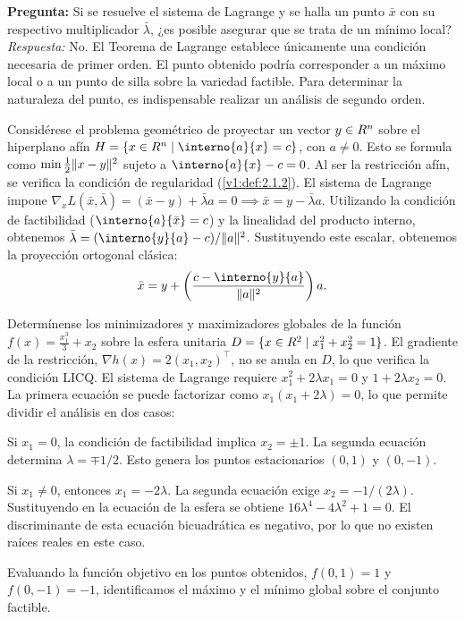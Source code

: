 \begin{controlbox}
 \textbf{Pregunta:} Si se resuelve el sistema de Lagrange y se halla un punto $\bar{x}$ con su respectivo multiplicador $\bar{\lambda}$, ¿es posible asegurar que se trata de un mínimo local? \\
 \textit{Respuesta:} No. El Teorema de Lagrange establece únicamente una condición necesaria de primer orden. El punto obtenido podría corresponder a un máximo local o a un punto de silla sobre la variedad factible. Para determinar la naturaleza del punto, es indispensable realizar un análisis de segundo orden.
\end{controlbox}

\begin{example}\label{v1:exa:2.2.3}
	Considérese el problema geométrico de proyectar un vector $y \in R^n$ sobre el hiperplano afín $H = \{ x \in \Rn \mid \interno{a}{x} = c \}$, con $a \neq 0$. Esto se formula como $\min \frac{1}{2} \lVert x - y\rVert^2$ sujeto a $\interno{a}{x} - c = 0$. Al ser la restricción afín, se verifica la condición de regularidad (\cref{v1:def:2.1.2}). El sistema de Lagrange impone $\nabla_x L(\bar{x}, \bar{\lambda}) = (\bar{x} - y) + \bar{\lambda} a = 0 \implies \bar{x} = y - \bar{\lambda} a$. Utilizando la condición de factibilidad ($\interno{a}{\bar{x}} = c$) y la linealidad del producto interno, obtenemos $\bar{\lambda} = (\interno{y}{a} - c)/\norm{a}^2$. Sustituyendo este escalar, obtenemos la proyección ortogonal clásica:
	\[
		\bar{x} = y + \left( \frac{c - \interno{y}{a}}{\norm{a}^2} \right) a.
	\]
\end{example}

\begin{example}\label{v1:exa:2.2.4}
 Determínense los minimizadores y maximizadores globales de la función $f(x) = \frac{x_1^3}{3} + x_2$ sobre la esfera unitaria $D = \{ x \in R^2 \mid x_1^2 + x_2^2 = 1 \}$. El gradiente de la restricción, $\nabla h(x) = 2(x_1, x_2)^\top$, no se anula en $D$, lo que verifica la condición LICQ. El sistema de Lagrange requiere $x_1^2 + 2\lambda x_1 = 0$ y $1 + 2\lambda x_2 = 0$. La primera ecuación se puede factorizar como $x_1(x_1 + 2\lambda) = 0$, lo que permite dividir el análisis en dos casos:
 \begin{enuthm}
 \item Si $x_1 = 0$, la condición de factibilidad implica $x_2 = \pm 1$. La segunda ecuación determina $\lambda = \mp 1/2$. Esto genera los puntos estacionarios $(0, 1)$ y $(0, -1)$.
 \item Si $x_1 \neq 0$, entonces $x_1 = -2\lambda$. La segunda ecuación exige $x_2 = -1/(2\lambda)$. Sustituyendo en la ecuación de la esfera se obtiene $16\lambda^4 - 4\lambda^2 + 1 = 0$. El discriminante de esta ecuación bicuadrática es negativo, por lo que no existen raíces reales en este caso.
 \end{enuthm}
 Evaluando la función objetivo en los puntos obtenidos, $f(0,1) = 1$ y $f(0,-1) = -1$, identificamos el máximo y el mínimo global sobre el conjunto factible.
\end{example}